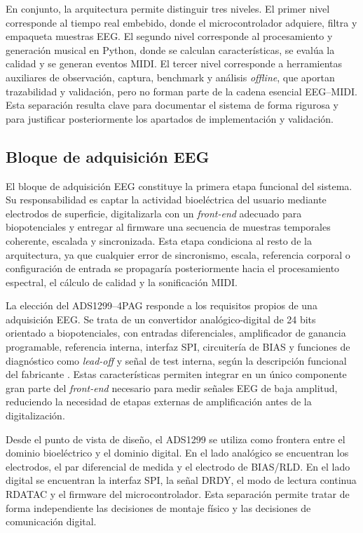 \documentclass[../main.tex]{subfiles}
\begin{document}
En conjunto, la arquitectura permite distinguir tres niveles. El primer nivel corresponde al tiempo real embebido, donde el microcontrolador adquiere, filtra y empaqueta muestras EEG. El segundo nivel corresponde al procesamiento y generación musical en Python, donde se calculan características, se evalúa la calidad y se generan eventos MIDI. El tercer nivel corresponde a herramientas auxiliares de observación, captura, benchmark y análisis \textit{offline}, que aportan trazabilidad y validación, pero no forman parte de la cadena esencial EEG--MIDI. Esta separación resulta clave para documentar el sistema de forma rigurosa y para justificar posteriormente los apartados de implementación y validación.

\subsection{Bloque de adquisición EEG}

El bloque de adquisición EEG constituye la primera etapa funcional del sistema. Su responsabilidad es captar la actividad bioeléctrica del usuario mediante electrodos de superficie, digitalizarla con un \textit{front-end} adecuado para biopotenciales y entregar al firmware una secuencia de muestras temporales coherente, escalada y sincronizada. Esta etapa condiciona al resto de la arquitectura, ya que cualquier error de sincronismo, escala, referencia corporal o configuración de entrada se propagaría posteriormente hacia el procesamiento espectral, el cálculo de calidad y la sonificación MIDI.

La elección del ADS1299--4PAG responde a los requisitos propios de una adquisición EEG. Se trata de un convertidor analógico-digital de 24 bits orientado a biopotenciales, con entradas diferenciales, amplificador de ganancia programable, referencia interna, interfaz SPI, circuitería de BIAS y funciones de diagnóstico como \textit{lead-off} y señal de test interna, según la descripción funcional del fabricante \cite{TexasInstrumentsADS1299}. Estas características permiten integrar en un único componente gran parte del \textit{front-end} necesario para medir señales EEG de baja amplitud, reduciendo la necesidad de etapas externas de amplificación antes de la digitalización.

Desde el punto de vista de diseño, el ADS1299 se utiliza como frontera entre el dominio bioeléctrico y el dominio digital. En el lado analógico se encuentran los electrodos, el par diferencial de medida y el electrodo de BIAS/RLD. En el lado digital se encuentran la interfaz SPI, la señal DRDY, el modo de lectura continua RDATAC y el firmware del microcontrolador. Esta separación permite tratar de forma independiente las decisiones de montaje físico y las decisiones de comunicación digital.
\end{document}
